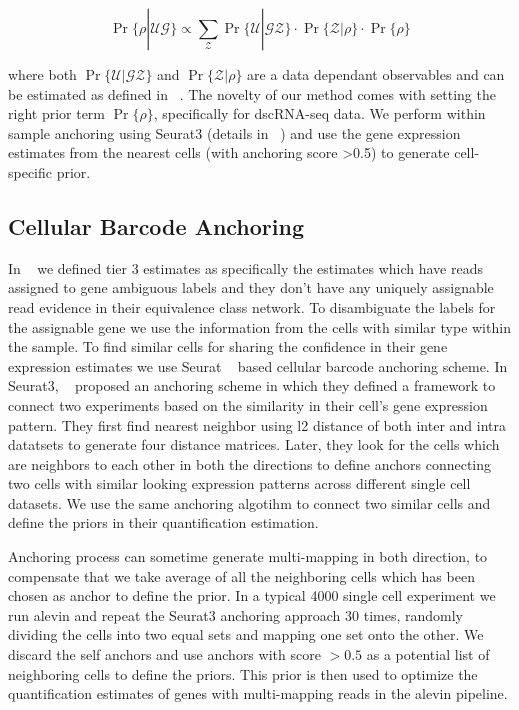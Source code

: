 \begin{equation}
	\Pr \{ \rho | \mathcal{U} \mathcal{G} \} 
	\propto \sum_{\mathcal{Z}} \Pr\{ \mathcal{U} | \mathcal{G} \mathcal{Z} \}
	\cdot \Pr\{ \mathcal{Z} | \rho \} \cdot \Pr\{ \rho \}
\end{equation}

where both $\Pr\{ \mathcal{U} | \mathcal{G} \mathcal{Z} \}$ and $\Pr\{ \mathcal{Z} | \rho \}$ are 
a data dependant observables and can be estimated as defined in ~\citep{salmon}. The novelty of our method
comes with setting the right prior term $\Pr\{ \rho \}$, specifically for dscRNA-seq data. We perform
within sample anchoring using Seurat3 (details in ~) and use the gene expression
estimates from the nearest cells (with anchoring score >0.5) to generate cell-specific prior.

\subsection{Cellular Barcode Anchoring}
\label{subsec:anchor}
In ~ we defined tier 3 estimates as specifically the estimates which have reads assigned 
to gene ambiguous labels and they don't have any uniquely assignable read evidence in their equivalence 
class network. To disambiguate the labels for the assignable gene we use the 
information from the cells with similar type within the sample. To find similar cells for sharing 
the confidence in their gene expression estimates we use Seurat ~\citep{seurat3} based cellular
barcode anchoring scheme. In Seurat3, ~\citep{seurat3} proposed an anchoring scheme in which they 
defined a framework to connect two experiments based on the similarity in their cell's gene expression 
pattern. They first find nearest neighbor using l2 distance of both inter and intra datatsets to generate 
four distance matrices. Later, they look for the cells which are neighbors to each other in both 
the directions to define anchors connecting two cells with similar looking expression patterns 
across different single cell datasets. We use the same anchoring algotihm to connect two similar 
cells and define the priors in their quantification estimation.

Anchoring process can sometime generate multi-mapping in both direction, to compensate that we take average 
of all the neighboring cells which has been chosen as anchor to define the prior. In a typical 4000 single 
cell experiment we run alevin and repeat the Seurat3 anchoring approach $30$ times, randomly dividing 
the cells into two equal sets and mapping one set onto the other. We discard the self anchors and use 
anchors with score $>0.5$ as a potential list of neighboring cells to define the priors. This prior 
is then used to optimize the quantification estimates of genes with multi-mapping reads in the alevin 
pipeline.

